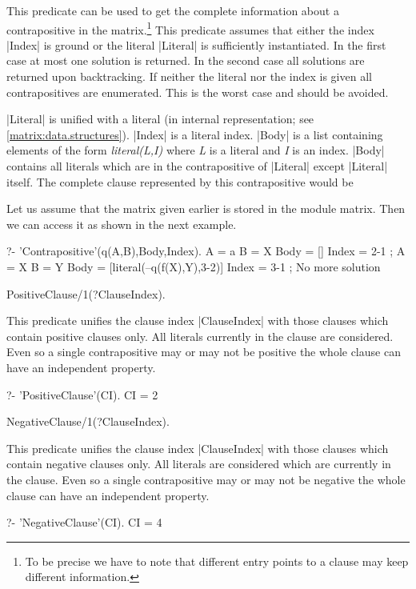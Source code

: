 This predicate can be used to get the complete information about a
contrapositive in the matrix.\footnote{To be precise we have to note that
  different entry points to a clause may keep different information.} This
predicate assumes that either the index |Index| is ground or the literal
|Literal| is sufficiently instantiated. In the first case at most one solution
is returned. In the second case all solutions are returned upon backtracking.
If neither the literal nor the index is given all contrapositives are
enumerated. This is the worst case and should be avoided.

|Literal| is unified with a literal (in internal representation; see
\ref{matrix:data.structures}). |Index| is a literal index. |Body| is a list
containing elements of the form {\em literal(L,I)}\/ where {\em L}\/ is a
literal and {\em I}\/ is an index. |Body| contains all literals which are in
the contrapositive of |Literal| except |Literal| itself. The complete clause
represented by this contrapositive would be
\begin{BoxedSample}
\end{BoxedSample}


Let us assume that the matrix given earlier is stored in the module {\sf
  matrix}. Then we can access it as shown in the next example.
\begin{BoxedSample}
  ?- 'Contrapositive'(q(A,B),Body,Index).
  A = a
  B = X
  Body = []
  Index = 2-1
  ;
  A = X
  B = Y
  Body = [literal(--q(f(X),Y),3-2)]
  Index = 3-1
  ;
  No more solution
\end{BoxedSample}


\Predicate PositiveClause/1(?ClauseIndex).

This predicate unifies the clause index |ClauseIndex| with those clauses which
contain positive clauses only. All literals currently
in the clause are considered. Even so a single contrapositive may or may not be positive the
whole clause can have an independent property.
\begin{BoxedSample}
  ?- 'PositiveClause'(CI).
  CI = 2
\end{BoxedSample}

\Predicate NegativeClause/1(?ClauseIndex).

This predicate unifies the clause index |ClauseIndex| with those clauses which
contain negative clauses only. All literals are considered which are currently
in the clause. Even so a single contrapositive may or may not be negative the
whole clause can have an independent property.
\begin{BoxedSample}
  ?- 'NegativeClause'(CI).
  CI = 4
\end{BoxedSample}

